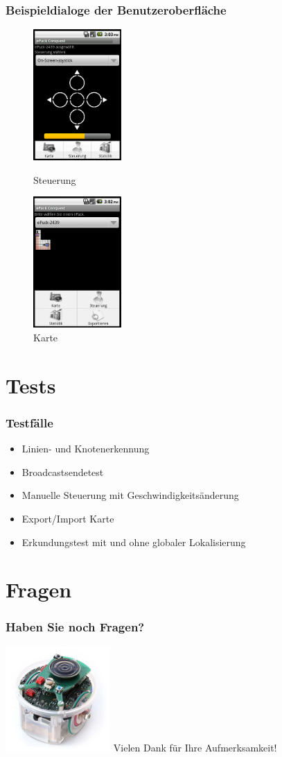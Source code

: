 \documentclass{beamer}
\begin{document}
\begin{frame}
  \frametitle{Beispieldialoge der Benutzeroberfläche}
	\begin{figure}[bp]
		\begin{minipage}[]{3.5cm}
			\includegraphics[height=5cm]{view1.png} 
			\caption{Steuerung}
		\end{minipage}
		\hspace{1cm}
		\begin{minipage}[]{3.5cm}
			\includegraphics[height=5cm]{view2.png} 
			\caption{Karte}
		\end{minipage}
	\end{figure}
\end{frame}

\section{Tests}
\begin{frame}
  \frametitle{Testfälle}
  
  	\begin{itemize}
		\item Linien- und Knotenerkennung
		\item Broadcastsendetest
		\item Manuelle Steuerung mit Geschwindigkeitsänderung
		\item Export/Import Karte
		\item Erkundungstest mit und ohne globaler Lokalisierung
	\end{itemize}  
	
\end{frame}

\section{Fragen}
\begin{frame}
	\frametitle{Haben Sie noch Fragen?}
		\includegraphics[height=4cm]{ende.jpg}
		\vspace{1cm}
	Vielen Dank für Ihre Aufmerksamkeit!
\end{frame}
\end{document}
